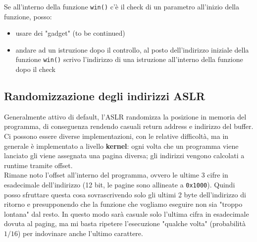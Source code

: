 
Se all'interno della funzione \texttt{win()} c'è il check di un parametro all'inizio della funzione, posso:
\begin{itemize}
	\item usare dei "gadget" (to be continued)
	\item andare ad un istruzione dopo il controllo, al posto dell'indirizzo iniziale della funzione \texttt{win()} scrivo l'indirizzo di una istruzione all'interno della funzione dopo il check
\end{itemize}


\subsection{Randomizzazione degli indirizzi ASLR}

Generalmente attivo di default, l'ASLR randomizza la posizione in memoria del programma, di conseguenza rendendo casuali return address e indirizzo del buffer. Ci possono essere diverse implementazioni, con le relative difficoltà, ma in generale è implementato a livello \textbf{kernel}: ogni volta che un programma viene lanciato gli viene assegnata una pagina diversa; gli indirizzi vengono calcolati a runtime tramite offset.\\

Rimane noto l'offset all'interno del programma, ovvero le ultime 3 cifre in esadecimale dell'indirizzo (12 bit, le pagine sono allineate a \texttt{0x1000}). Quindi posso sfruttare questa cosa sovrascrivendo solo gli ultimi 2 byte dell'indirizzo di ritorno e presupponendo che la funzione che vogliamo eseguire non sia "troppo lontana" dal resto. In questo modo sarà casuale solo l'ultima cifra in esadecimale dovuta al paging, ma mi basta ripetere l'esecuzione "qualche volta" (probabilità $1/16$) per indovinare anche l'ultimo carattere.\\


